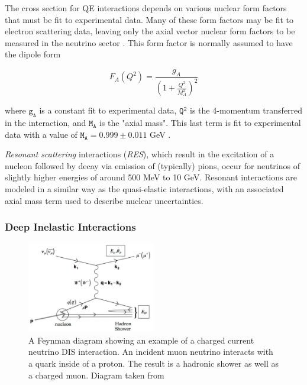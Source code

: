 The cross section for QE interactions depends on various nuclear form factors that must be fit to experimental data.
Many of these form factors may be fit to electron scattering data, leaving only the axial vector nuclear form factors to be measured in the neutrino sector \cite{Formaggio-Xsec}.
This form factor is normally assumed to have the dipole form 

\begin{equation}
F_A\left(Q^2\right) = \frac{g_A}{\left(1+\frac{Q^2}{M_A^2}\right)^2}
\label{eq:axial_mass_eq}
\end{equation}

where $\mathtt{g_A}$ is a constant fit to experimental data, $\mathtt{Q^2}$ is the 4-momentum transferred in the interaction, and $\mathtt{M_A}$ is the "axial mass".
This last term is fit to experimental data with a value of $\mathtt{M_A = 0.999 \pm 0.011}$ GeV \cite{Formaggio-Xsec}.

\emph{Resonant scattering} interactions (\emph{RES}), which result in the excitation of a nucleon followed by decay via emission of (typically) pions, occur for neutrinos of slightly higher energies of around 500 MeV to 10 GeV.
Resonant interactions are modeled in a similar way as the quasi-elastic interactions, with an associated axial mass term used to describe nuclear uncertainties.

\subsubsection{Deep Inelastic Interactions}
\begin{figure}
\centering
\includegraphics[width=0.5\textwidth]{dis_feynman.png}
\caption[A Feynman diagram of a charged current DIS neutrino interaction]{A Feynman diagram showing an example of a charged current neutrino DIS interaction. An incident muon neutrino interacts with a quark inside of a proton. The result is a hadronic shower as well as a charged muon. Diagram taken from \cite{Formaggio-Xsec}}
\label{fig:dis_feynman}
\end{figure}

